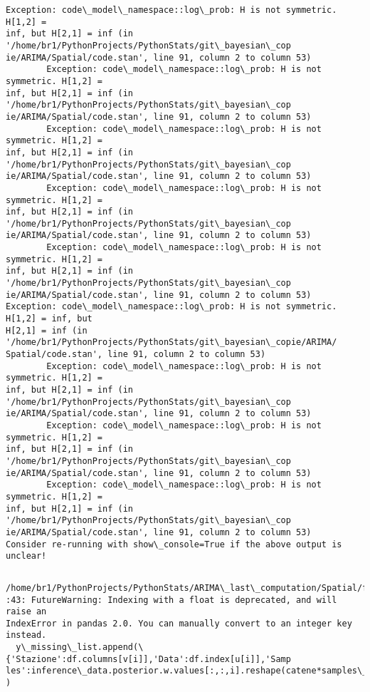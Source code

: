 \documentclass[11pt]{article}
\begin{document}
\begin{Verbatim}[commandchars=\\\{\}]
        Exception: code\_model\_namespace::log\_prob: H is not symmetric. H[1,2] =
inf, but H[2,1] = inf (in '/home/br1/PythonProjects/PythonStats/git\_bayesian\_cop
ie/ARIMA/Spatial/code.stan', line 91, column 2 to column 53)
        Exception: code\_model\_namespace::log\_prob: H is not symmetric. H[1,2] =
inf, but H[2,1] = inf (in '/home/br1/PythonProjects/PythonStats/git\_bayesian\_cop
ie/ARIMA/Spatial/code.stan', line 91, column 2 to column 53)
        Exception: code\_model\_namespace::log\_prob: H is not symmetric. H[1,2] =
inf, but H[2,1] = inf (in '/home/br1/PythonProjects/PythonStats/git\_bayesian\_cop
ie/ARIMA/Spatial/code.stan', line 91, column 2 to column 53)
        Exception: code\_model\_namespace::log\_prob: H is not symmetric. H[1,2] =
inf, but H[2,1] = inf (in '/home/br1/PythonProjects/PythonStats/git\_bayesian\_cop
ie/ARIMA/Spatial/code.stan', line 91, column 2 to column 53)
        Exception: code\_model\_namespace::log\_prob: H is not symmetric. H[1,2] =
inf, but H[2,1] = inf (in '/home/br1/PythonProjects/PythonStats/git\_bayesian\_cop
ie/ARIMA/Spatial/code.stan', line 91, column 2 to column 53)
Exception: code\_model\_namespace::log\_prob: H is not symmetric. H[1,2] = inf, but
H[2,1] = inf (in '/home/br1/PythonProjects/PythonStats/git\_bayesian\_copie/ARIMA/
Spatial/code.stan', line 91, column 2 to column 53)
        Exception: code\_model\_namespace::log\_prob: H is not symmetric. H[1,2] =
inf, but H[2,1] = inf (in '/home/br1/PythonProjects/PythonStats/git\_bayesian\_cop
ie/ARIMA/Spatial/code.stan', line 91, column 2 to column 53)
        Exception: code\_model\_namespace::log\_prob: H is not symmetric. H[1,2] =
inf, but H[2,1] = inf (in '/home/br1/PythonProjects/PythonStats/git\_bayesian\_cop
ie/ARIMA/Spatial/code.stan', line 91, column 2 to column 53)
        Exception: code\_model\_namespace::log\_prob: H is not symmetric. H[1,2] =
inf, but H[2,1] = inf (in '/home/br1/PythonProjects/PythonStats/git\_bayesian\_cop
ie/ARIMA/Spatial/code.stan', line 91, column 2 to column 53)
Consider re-running with show\_console=True if the above output is unclear!
    \end{Verbatim}

    \begin{Verbatim}[commandchars=\\\{\}]

    \end{Verbatim}

    \begin{Verbatim}[commandchars=\\\{\}]
/home/br1/PythonProjects/PythonStats/ARIMA\_last\_computation/Spatial/fit\_arima.py
:43: FutureWarning: Indexing with a float is deprecated, and will raise an
IndexError in pandas 2.0. You can manually convert to an integer key instead.
  y\_missing\_list.append(\{'Stazione':df.columns[v[i]],'Data':df.index[u[i]],'Samp
les':inference\_data.posterior.w.values[:,:,i].reshape(catene*samples\_per\_chain)\}
)
    \end{Verbatim}
\end{document}
